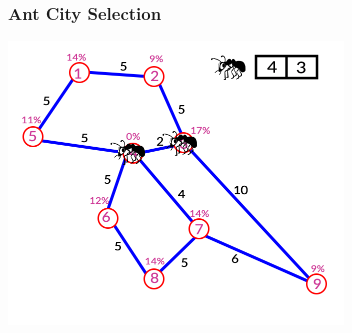\documentclass[12pt]{beamer}
\begin{document}
\begin{frame}
\frametitle{Ant City Selection}
\begin{center}
\includegraphics[height=75mm]{Images/antblack4}\\
\end{center}
\end{frame}
\end{document}

